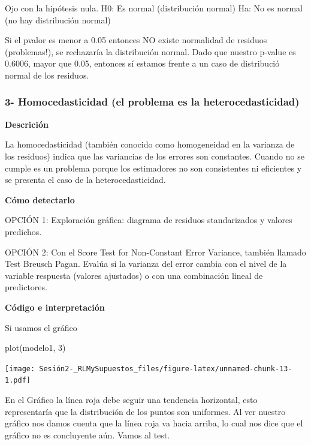\documentclass[
]{article}
\newenvironment{Shaded}{\begin{snugshade}}{\end{snugshade}}
\newcommand{\DecValTok}[1]{\textcolor[rgb]{0.00,0.00,0.81}{#1}}
\newcommand{\FunctionTok}[1]{\textcolor[rgb]{0.00,0.00,0.00}{#1}}
\newcommand{\NormalTok}[1]{#1}
\begin{document}
Ojo con la hipótesis nula. H0: Es normal (distribución normal)
\textbar{} Ha: No es normal (no hay distribución normal)

Si el pvalor es menor a 0.05 entonces NO existe normalidad de residuos
(problemas!), se rechazaría la distribución normal. Dado que nuestro
p-value es 0.6006, mayor que 0.05, entonces sí estamos frente a un caso
de distribució normal de los residuos.

\hypertarget{homocedasticidad-el-problema-es-la-heterocedasticidad}{%
\subsubsection{3- Homocedasticidad (el problema es la
heterocedasticidad)}\label{homocedasticidad-el-problema-es-la-heterocedasticidad}}

\textbf{Descrición}

La homocedasticidad (también conocido como homogeneidad en la varianza
de los residuos) indica que las variancias de los errores son
constantes. Cuando no se cumple es un problema porque los estimadores no
son consistentes ni eficientes y se presenta el caso de la
heterocedasticidad.

\textbf{Cómo detectarlo}

OPCIÓN 1: Exploración gráfica: diagrama de residuos standarizados y
valores predichos.

OPCIÓN 2: Con el Score Test for Non-Constant Error Variance, también
llamado Test Breusch Pagan. Evalúa si la varianza del error cambia con
el nivel de la variable respuesta (valores ajustados) o con una
combinación lineal de predictores.

\textbf{Código e interpretación}

Si usamos el gráfico

\begin{Shaded}
\begin{Highlighting}[]
\FunctionTok{plot}\NormalTok{(modelo1, }\DecValTok{3}\NormalTok{)}
\end{Highlighting}
\end{Shaded}

\texttt{[image: Sesión2-\_RLMySupuestos\_files/figure-latex/unnamed-chunk-13-1.pdf]}

En el Gráfico la línea roja debe seguir una tendencia horizontal, esto
representaría que la distribución de los puntos son uniformes. Al ver
nuestro gráfico nos damos cuenta que la línea roja va hacia arriba, lo
cual nos dice que el gráfico no es concluyente aún. Vamos al test.
\end{document}
